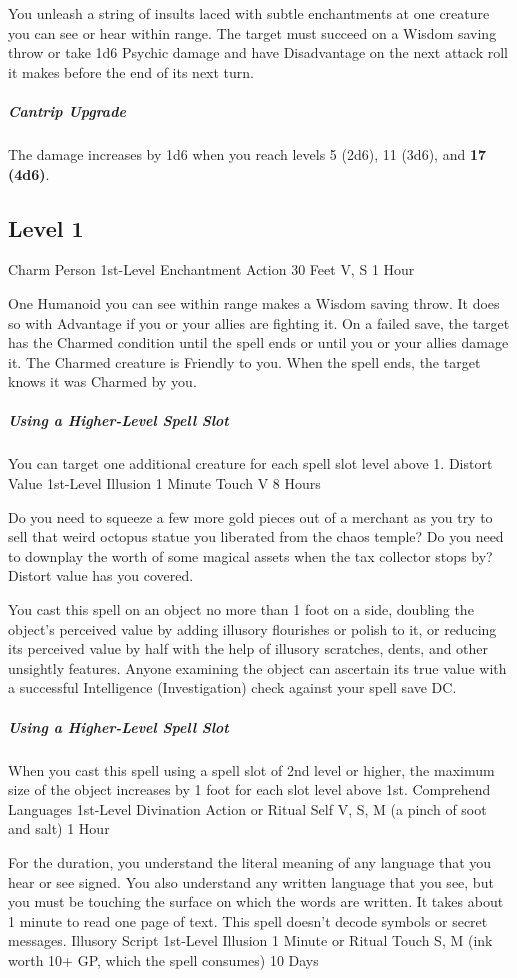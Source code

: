 \documentclass[letterpaper,openany,oneside,twocolumn]{book}
\begin{document}
You unleash a string of insults laced with subtle enchantments at one creature you can see or hear within range. The target must succeed on a Wisdom saving throw or take 1d6 Psychic damage and have Disadvantage on the next attack roll it makes before the end of its next turn.

\subparagraph*{Cantrip Upgrade} The damage increases by 1d6 when you reach levels 5 (2d6), 11 (3d6), and \textbf{17 (4d6)}.

\subsection*{Level 1}
\DndSpellHeader
  {Charm Person}
  {1st-Level Enchantment}
  {Action}
  {30 Feet}
  {V, S}
  {1 Hour}

One Humanoid you can see within range makes a Wisdom saving throw. It does so with Advantage if you or your allies are fighting it. On a failed save, the target has the Charmed condition until the spell ends or until you or your allies damage it. The Charmed creature is Friendly to you. When the spell ends, the target knows it was Charmed by you.

\subparagraph*{Using a Higher-Level Spell Slot} You can target one additional creature for each spell slot level above 1.
\DndSpellHeader
  {Distort Value}
  {1st-Level Illusion}
  {1 Minute}
  {Touch}
  {V}
  {8 Hours}

Do you need to squeeze a few more gold pieces out of a merchant as you try to sell that weird octopus statue you liberated from the chaos temple? Do you need to downplay the worth of some magical assets when the tax collector stops by? Distort value has you covered.

You cast this spell on an object no more than 1 foot on a side, doubling the object's perceived value by adding illusory flourishes or polish to it, or reducing its perceived value by half with the help of illusory scratches, dents, and other unsightly features. Anyone examining the object can ascertain its true value with a successful Intelligence (Investigation) check against your spell save DC.

\subparagraph*{Using a Higher-Level Spell Slot} When you cast this spell using a spell slot of 2nd level or higher, the maximum size of the object increases by 1 foot for each slot level above 1st.
\DndSpellHeader
  {Comprehend Languages}
  {1st-Level Divination}
  {Action or Ritual}
  {Self}
  {V, S, M (a pinch of soot and salt)}
  {1 Hour}

For the duration, you understand the literal meaning of any language that you hear or see signed. You also understand any written language that you see, but you must be touching the surface on which the words are written. It takes about 1 minute to read one page of text. This spell doesn't decode symbols or secret messages.
\DndSpellHeader
  {Illusory Script}
  {1st-Level Illusion}
  {1 Minute or Ritual}
  {Touch}
  {S, M (ink worth 10+ GP, which the spell consumes)}
  {10 Days}
\end{document}
